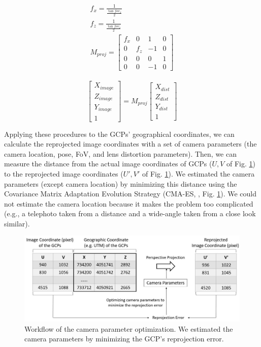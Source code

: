 \documentclass{article}
\begin{document}
\begin{gather}
\label{proj_mat}
  \begin{gathered}
  f_x = \frac{1}{\frac{\tan fov_x}{2}} \\
  f_z = \frac{1}{\frac{\tan fov_z}{2}} \\
  M_{proj} = 
  \begin{bmatrix} 
    f_x & 0 & 1 & 0\\ 
    0 & f_z & -1 & 0 \\ 
    0 & 0 & 0 & 1\\ 
    0 & 0 & -1 & 0 
  \end{bmatrix}
  \end{gathered}
\end{gather}

\begin{equation}
\label{proj_tf}
  \begin{bmatrix} 
    X_{image} \\ Z_{image} \\ Y_{image} \\ 1 
  \end{bmatrix}
  =
  M_{proj}
  \begin{bmatrix} 
    X_{dist} \\ Z_{dist} \\ Y_{dist} \\ 1 
  \end{bmatrix}
\end{equation}

Applying these procedures to the GCPs' geographical coordinates, we can calculate the reprojected image coordinates with a set of camera parameters (the camera location, pose, FoV, and lens distortion parameters). Then, we can measure the distance from the actual image coordinates of GCPs (\(U, V\) of Fig. \ref{fig:optim}) to the reprojected image coordinates (\(U', V'\) of Fig. \ref{fig:optim}). We estimated the camera parameters (except camera location) by minimizing this distance using the Covariance Matrix Adaptation Evolution Strategy (CMA-ES, \cite{Hansen2003CMAES}, Fig. \ref{fig:optim}). We could not estimate the camera location because it makes the problem too complicated (e.g., a telephoto taken from a distance and a wide-angle taken from a close look similar).



\begin{figure}
\includegraphics[width=1\linewidth]{paper_files/figures/Slide5} \caption{Workflow of the camera parameter optimization. We estimated the camera parameters by minimizing the GCP's reprojection error.}\label{fig:optim}
\end{figure}
\end{document}
